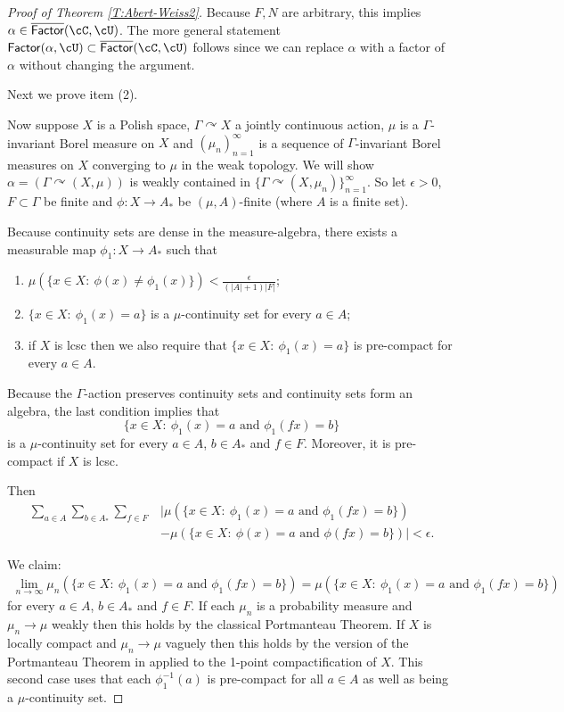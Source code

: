 \documentclass[12pt]{article}
\theoremstyle{plain}
\theoremstyle{definition}
\theoremstyle{remark}
\newcommand{\G}{\Gamma}
\newcommand{\eps}{\epsilon}
\renewcommand\a{\alpha}
\def\cc{{\curvearrowright}}
\begin{document}
\begin{proof}[Proof of Theorem \ref{T:Abert-Weiss2}]
Because $F,N$ are arbitrary, this implies $\a\in \overline{\mathsf{Factor}}(\cC,\cU)$. The more general statement $\mathsf{Factor}(\a,\cU) \subset \overline{\mathsf{Factor}}(\cC,\cU)$ follows since we can replace $\a$ with a factor of $\a$ without changing the argument.


Next we prove item (2).


Now suppose $X$ is a Polish space, $\G \cc X$ a jointly continuous action, $\mu$ is a $\G$-invariant Borel measure on $X$ and $(\mu_n)_{n=1}^\infty$ is a sequence of $\G$-invariant Borel measures on $X$ converging to $\mu$ in the weak topology. We will show $\a=(\G \cc (X,\mu))$ is weakly contained in $\{\G \cc (X,\mu_n)\}_{n=1}^\infty$. So let  $\eps>0$, $F \subset \G$ be finite and $\phi:X \to A_*$ be $(\mu,A)$-finite (where $A$ is a finite set). 


Because continuity sets are dense in the measure-algebra, there exists a measurable map $\phi_1:X \to A_*$ such that
\begin{enumerate}
    \item $\mu(\{x\in X:~\phi(x)\ne \phi_1(x)\})<\frac{\eps}{(|A|+1)|F|}$;
    \item $\{x\in X:~\phi_1(x)=a\}$ is a $\mu$-continuity set for every $a\in A$;
    \item if $X$ is lcsc then we also require that $\{x\in X:~\phi_1(x)=a\}$ is pre-compact for every $a\in A$.
\end{enumerate}
Because the $\G$-action preserves continuity sets and continuity sets form an algebra, the last condition implies that
$$\{x\in X:~\phi_1(x)=a    \textrm{ and }   \phi_1(fx)=b\}$$
is a $\mu$-continuity set for every $a\in A$, $b\in A_*$ and $f\in F$. Moreover, it is pre-compact if $X$ is lcsc.


Then
\begin{align*}
\sum_{a\in A} \sum_{b\in A_*} \sum_{f\in F} &\big|\mu(\{x\in X:~\phi_1(x)=a \textrm{ and }   \phi_1(fx)=b\}) \\
&- \mu(\{x\in X:~\phi(x)=a \textrm{ and }   \phi(fx)=b \}) \big| < \eps.   
\end{align*}

We claim: 
\begin{align*}
\lim_{n\to\infty} \mu_n(\{x\in X:~\phi_1(x)=a \textrm{ and }   \phi_1(fx)=b \}) = \mu(\{x\in X:~\phi_1(x)=a \textrm{ and }   \phi_1(fx)=b \})
\end{align*}
for every $a\in A$, $b\in A_*$ and $f\in F$. If each $\mu_n$ is a probability measure and $\mu_n\to \mu$ weakly then this holds by the classical Portmanteau Theorem. If $X$ is locally compact and $\mu_n \to \mu$ vaguely then this holds by the version of the Portmanteau Theorem in \cite{MR2271177} applied to the 1-point compactification of $X$. This second case uses that each $\phi_1^{-1}(a)$ is pre-compact for all $a\in A$ as well as being a $\mu$-continuity set. 


\end{proof}
\end{document}
